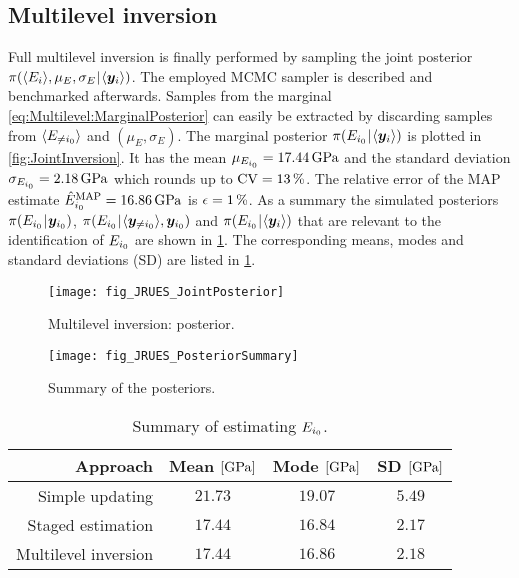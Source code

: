 \subsection{Multilevel inversion}
Full multilevel inversion is finally performed by sampling the joint posterior \(\pi(\langle{E_i}\rangle,\mu_E,\sigma_E {\:\!}|{\:\!} \langle{\bm{y}_i}\rangle)\).
The employed MCMC sampler is described and benchmarked afterwards.
Samples from the marginal \cref{eq:Multilevel:MarginalPosterior} can easily be extracted by discarding samples from \(\langle{E_{\neq i_0}}\rangle\) and \((\mu_E,\sigma_E)\).
The marginal posterior \(\pi(E_{i_0} {\:\!}|{\:\!} \langle{\bm{y}_i}\rangle)\) is plotted in \cref{fig:JointInversion}.
It has the mean \(\mu_{E_{\analyzed}} = \unit[17.44]{GPa}\) and the standard deviation \(\sigma_{E_{\analyzed}} = \unit[2.18]{GPa}\) which rounds up to \(\mathrm{CV} = \unit[13]{\%}\).
The relative error of the MAP estimate \(\hat{E}_{\analyzed}^{\mathrm{MAP}} = \unit[16.86]{GPa}\) is \(\epsilon = \unit[1]{\%}\).
As a summary the simulated posteriors \(\pi(E_{i_0} {\:\!}|{\:\!} \bm{y}_{i_0})\), \(\pi(E_{i_0} {\:\!}|{\:\!} \langle{\bm{y}_{\neq i_0}}\rangle,\bm{y}_{i_0})\)
and \(\pi(E_{i_0} {\:\!}|{\:\!} \langle{\bm{y}_i}\rangle)\) that are relevant to the identification of \(E_{\analyzed}\) are shown in \cref{fig:PosteriorSummary}.
The corresponding means, modes and standard deviations (SD) are listed in \cref{tab:PosteriorSummary}.
\begin{figure}[ht]
  \begin{minipage}[b]{0.49\linewidth}
    \centering
    \texttt{[image: fig\_JRUES\_JointPosterior]}
    \caption[Multilevel inversion: posterior]{Multilevel inversion: posterior.}
    \label{fig:JointInversion}
  \end{minipage}%
  \hfill
  \begin{minipage}[b]{0.49\linewidth}
    \centering
    \texttt{[image: fig\_JRUES\_PosteriorSummary]}
    \caption[Summary of the posteriors]{Summary of the posteriors.}
    \label{fig:PosteriorSummary}
  \end{minipage}%
\end{figure}
\begin{table}[htbp]
  \caption[Summary of estimating \(E_{\analyzed}\)]{Summary of estimating \(E_{\analyzed}\).}
  \label{tab:PosteriorSummary}
  \centering
  \begin{tabular}{rccc}
    \toprule
    Approach & Mean \(\lbrack\unit[]{GPa}\rbrack\) & Mode \(\lbrack\unit[]{GPa}\rbrack\) & SD \(\lbrack\unit[]{GPa}\rbrack\) \\
    \midrule
    Simple updating      & \(21.73\) & \(19.07\) & \(5.49\) \\
    Staged estimation    & \(17.44\) & \(16.84\) & \(2.17\) \\
    Multilevel inversion & \(17.44\) & \(16.86\) & \(2.18\) \\
    \bottomrule
  \end{tabular}
\end{table}
